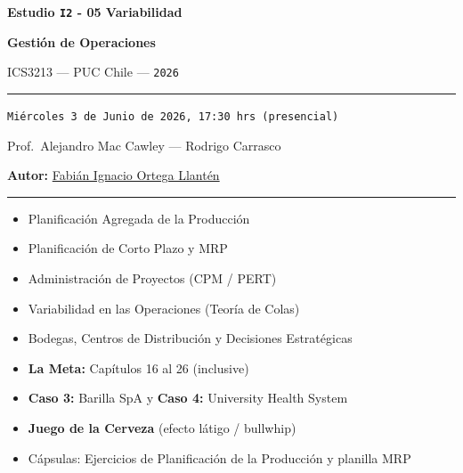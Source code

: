 \documentclass[11pt, a4paper]{article}
\begin{document}
\begin{titlepage}
  \centering
  \vspace*{2cm}
  {\Huge\bfseries\color{gopcyan} Estudio \texttt{I2} - 05 Variabilidad\par}
  \vspace{0.4cm}
  {\LARGE\bfseries Gestión de Operaciones\par}
  \vspace{0.3cm}
  {\large ICS3213 --- PUC Chile --- \texttt{2026}\par}
  \vspace{1.2cm}
  \rule{\textwidth}{0.4pt}
  \vspace{0.4cm}

  {\normalsize \texttt{Miércoles 3 de Junio de 2026, 17:30 hrs (presencial)}\par}
  \vspace{0.2cm}
  {\small Prof.\ Alejandro Mac Cawley --- Rodrigo Carrasco\par}
  \vspace{0.2cm}
  {\small\textbf{Autor:} \href{https://cl.linkedin.com/in/fabian-ortega-llanten}{Fabián Ignacio Ortega Llantén}\par}
  \vspace{0.4cm}
  \rule{\textwidth}{0.4pt}
  \vspace{1cm}

  \begin{resumentemario}
    \begin{itemize}[leftmargin=1.2em, itemsep=2pt]
      \item Planificación Agregada de la Producción
      \item Planificación de Corto Plazo y MRP
      \item Administración de Proyectos (CPM / PERT)
      \item Variabilidad en las Operaciones (Teoría de Colas)
      \item Bodegas, Centros de Distribución y Decisiones Estratégicas
      \item \textbf{La Meta:} Capítulos 16 al 26 (inclusive)
      \item \textbf{Caso 3:} Barilla SpA \quad y \quad \textbf{Caso 4:} University Health System
      \item \textbf{Juego de la Cerveza} (efecto látigo / bullwhip)
      \item Cápsulas: Ejercicios de Planificación de la Producción y planilla MRP
    \end{itemize}
  \end{resumentemario}


\end{titlepage}
\end{document}
